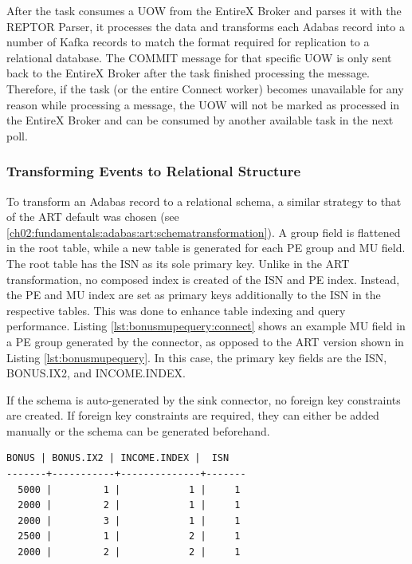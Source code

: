 After the task consumes a \ac{UOW} from the EntireX Broker and parses it with the \ac{REPTOR} Parser, it processes the data and transforms each Adabas record into a number of Kafka records to match the format required for replication to a relational database. The COMMIT message for that specific \ac{UOW} is only sent back to the EntireX Broker after the task finished processing the message. Therefore, if the task (or the entire Connect worker) becomes unavailable for any reason while processing a message, the \ac{UOW} will not be marked as processed in the EntireX Broker and can be consumed by another available task in the next poll.

\subsubsection{Transforming Events to Relational Structure}
\label{ch04:pipelinedevelopment:implementation:transformingtorelational}
To transform an Adabas record to a relational schema, a similar strategy to that of the \ac{ART} default was chosen (see \ref{ch02:fundamentals:adabas:art:schematransformation}). A group field is flattened in the root table, while a new table is generated for each PE group and MU field. The root table has the \ac{ISN} as its sole primary key. Unlike in the \ac{ART} transformation, no composed index is created of the \ac{ISN} and PE index. Instead, the PE and MU index are set as primary keys additionally to the \ac{ISN} in the respective tables. This was done to enhance table indexing and query performance. Listing \ref{lst:bonusmupequery:connect} shows an example MU field in a PE group generated by the connector, as opposed to the \ac{ART} version shown in Listing \ref{lst:bonusmupequery}. In this case, the primary key fields are the \ac{ISN}, BONUS.IX2, and INCOME.INDEX.

If the schema is auto-generated by the sink connector, no foreign key constraints are created. If foreign key constraints are required, they can either be added manually or the schema can be generated beforehand.


\newpage
\begin{lstlisting}[frame=tb,caption={Query result of the MU field BONUS in the PE field INCOME in the relational table employees\_INCOME\_BONUS (Kafka Connect version)},label=lst:bonusmupequery:connect]
 BONUS | BONUS.IX2 | INCOME.INDEX |  ISN
-------+-----------+--------------+-------
  5000 |         1 |            1 |     1
  2000 |         2 |            1 |     1
  2000 |         3 |            1 |     1
  2500 |         1 |            2 |     1
  2000 |         2 |            2 |     1
\end{lstlisting}

